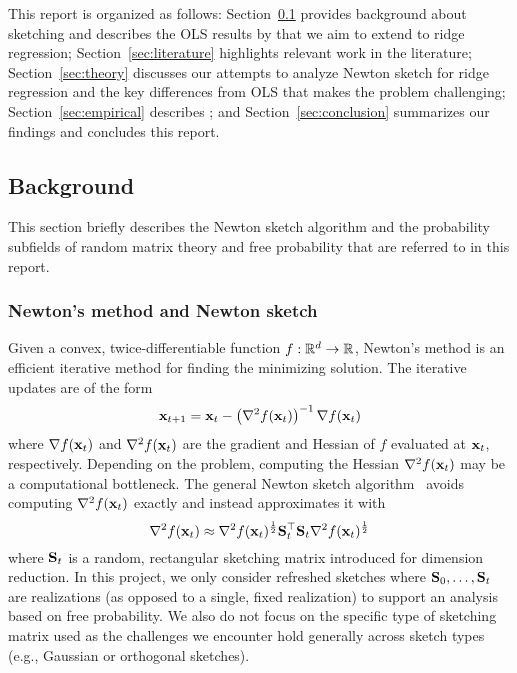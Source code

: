 This report is organized as follows: Section~\ref{sec:background} provides background about sketching and describes the OLS results by \citet{Lacotte:2020} that we aim to extend to ridge regression; Section~\ref{sec:literature} highlights relevant work in the literature; Section~\ref{sec:theory} discusses our attempts to analyze Newton sketch for ridge regression and the key differences from OLS that makes the problem challenging; Section~\ref{sec:empirical} describes \todo; and Section~\ref{sec:conclusion} summarizes our findings and concludes this report.

\subsection{Background} \label{sec:background}

This section briefly describes the Newton sketch algorithm and the probability subfields of random matrix theory and free probability that are referred to in this report.

\subsubsection{Newton's method and Newton sketch} \label{sec:newton}

Given a convex, twice-differentiable function $f:\mathbb{R}^d\rightarrow\mathbb{R}$, Newton's method is an efficient iterative method for finding the minimizing solution. The iterative updates are of the form
\[
\mathbf{x}_{t+1} = \mathbf{x}_t - \left(\nabla^2f(\mathbf{x}_t)\right)^{-1}\nabla f(\mathbf{x}_t)
\]
where $\nabla f(\mathbf{x}_t)$ and $\nabla^2f(\mathbf{x}_t)$ are the gradient and Hessian of $f$ evaluated at $\mathbf{x}_t$, respectively. Depending on the problem, computing the Hessian $\nabla^2f(\mathbf{x}_t)$ may be a computational bottleneck. The general Newton sketch algorithm~\citep{Pilanci:2017} avoids computing $\nabla^2f(\mathbf{x}_t)$ exactly and instead approximates it with
\[
\nabla^2f(\mathbf{x}_t) \approx \nabla^2f(\mathbf{x}_t)^\frac{1}{2}\mathbf{S}_t^\top\mathbf{S}_t\nabla^2f(\mathbf{x}_t)^\frac{1}{2}
\]
where $\mathbf{S}_t$ is a random, rectangular sketching matrix introduced for dimension reduction. In this project, we only consider refreshed sketches where $\mathbf{S}_0,\ldots,\mathbf{S}_t$ are \iid realizations (as opposed to a single, fixed realization) to support an analysis based on free probability. We also do not focus on the specific type of sketching matrix used as the challenges we encounter hold generally across sketch types (e.g., \iid Gaussian or orthogonal sketches).
\\

